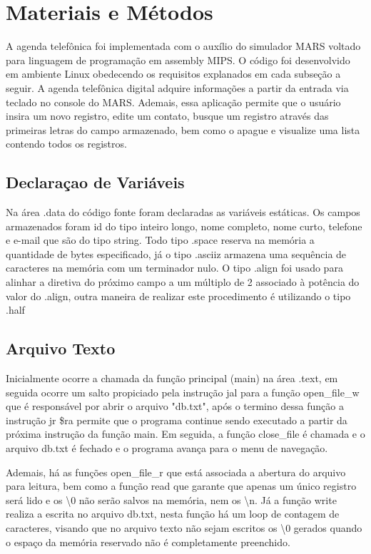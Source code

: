 \documentclass[10pt,twocolumn,letterpaper]{article}
\begin{document}
\section{Materiais e Métodos}

A agenda telefônica foi implementada com o auxílio do simulador MARS voltado para linguagem de programação em assembly MIPS. O código foi desenvolvido em ambiente Linux obedecendo os requisitos explanados em cada subseção a seguir. A agenda telefônica digital adquire informações a partir da entrada via teclado no console do MARS. Ademais, essa aplicação permite que o usuário insira um novo registro, edite um contato, busque um registro através das primeiras letras do campo armazenado, bem como o apague e visualize uma lista contendo todos os registros.

\subsection{Declaraçao de Variáveis}

Na área .data do código fonte foram declaradas as variáveis estáticas. Os campos armazenados foram id do tipo inteiro longo, nome completo, nome curto, telefone e
e-mail que são do tipo string. Todo tipo .space reserva na memória a quantidade de bytes especificado, já o tipo .asciiz armazena uma sequência de caracteres na memória com um terminador nulo. O tipo .align foi usado para alinhar a diretiva do próximo campo a um múltiplo de 2 associado à potência do valor do .align, outra maneira de realizar este procedimento é utilizando o tipo .half 

\subsection{Arquivo Texto}

Inicialmente ocorre a chamada da função principal (main) na área .text, em seguida ocorre um salto propiciado pela instrução jal para a função open\_file\_w que é responsável por abrir o arquivo "db.txt", após o termino dessa função a instrução jr \$ra permite que o programa continue sendo executado a partir da próxima instrução da função main. Em seguida, a função close\_file é chamada e o arquivo db.txt é fechado e o programa avança para o menu de navegação.

Ademais, há as funções open\_file\_r que está associada a abertura do arquivo para leitura, bem como a função read que garante que apenas um único registro será lido e os \textbackslash0 não serão salvos na memória, nem os \textbackslash n. Já a função write realiza a escrita no arquivo db.txt, nesta função há um loop de contagem de caracteres, visando que no arquivo texto não sejam escritos os \textbackslash0 gerados quando o espaço da memória reservado não é completamente preenchido.  
\end{document}
